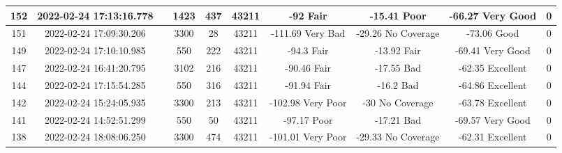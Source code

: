 \begin{longtable*}{|c|c|c|c|c|c|c|c|c|c|}
152&2022-02-24 17:13:16.778&&1423&437&43211& -92       Fair        & -15.41    Poor        & -66.27    Very Good   & 0\\\hline
{}151&2022-02-24 17:09:30.206&&3300&28&43211& -111.69   Very Bad    & -29.26    No Coverage & -73.06    Good        & 0\\\hline
{}149&2022-02-24 17:10:10.985&&550&222&43211& -94.3     Fair        & -13.92    Fair        & -69.41    Very Good   & 0\\\hline
{}147&2022-02-24 16:41:20.795&&3102&216&43211& -90.46    Fair        & -17.55    Bad         & -62.35    Excellent   & 0\\\hline
{}144&2022-02-24 17:15:54.285&&550&316&43211& -91.94    Fair        & -16.2     Bad         & -64.86    Excellent   & 0\\\hline
{}142&2022-02-24 15:24:05.935&&3300&213&43211& -102.98   Very Poor   & -30       No Coverage & -63.78    Excellent   & 0\\\hline
{}141&2022-02-24 14:52:51.299&&550&50&43211& -97.17    Poor        & -17.21    Bad         & -69.57    Very Good   & 0\\\hline
{}138&2022-02-24 18:08:06.250&&3300&474&43211& -101.01   Very Poor   & -29.33    No Coverage & -62.31    Excellent   & 0\\\hline

\end{longtable*}
